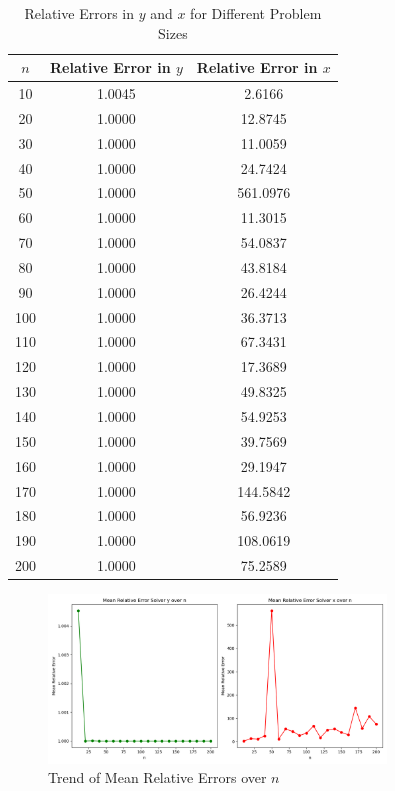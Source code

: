 \documentclass{article}
\begin{document}
\begin{table}[h]
    \centering
    \begin{tabular}{|c|c|c|}
        \hline
        $n$ & Relative Error in $y$ & Relative Error in $x$ \\
        \hline
        10 & 1.0045 & 2.6166 \\
        20 & 1.0000 & 12.8745 \\
        30 & 1.0000 & 11.0059 \\
        40 & 1.0000 & 24.7424 \\
        50 & 1.0000 & 561.0976 \\
        60 & 1.0000 & 11.3015 \\
        70 & 1.0000 & 54.0837 \\
        80 & 1.0000 & 43.8184 \\
        90 & 1.0000 & 26.4244 \\
        100 & 1.0000 & 36.3713 \\
        110 & 1.0000 & 67.3431 \\
        120 & 1.0000 & 17.3689 \\
        130 & 1.0000 & 49.8325 \\
        140 & 1.0000 & 54.9253 \\
        150 & 1.0000 & 39.7569 \\
        160 & 1.0000 & 29.1947 \\
        170 & 1.0000 & 144.5842 \\
        180 & 1.0000 & 56.9236 \\
        190 & 1.0000 & 108.0619 \\
        200 & 1.0000 & 75.2589 \\
        \hline
    \end{tabular}
    \caption{Relative Errors in $y$ and $x$ for Different Problem Sizes}
    \label{tab:relative_errors}
\end{table}

\begin{figure}[h]
    \centering
    \includegraphics[width=0.8\textwidth]{means.png}
    \caption{Trend of Mean Relative Errors over $n$}
    \label{fig:means}
\end{figure}
\end{document}
